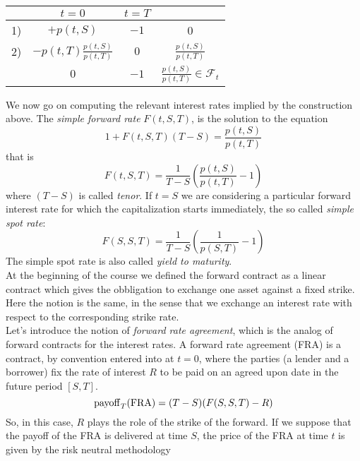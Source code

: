 \begin{center}
    \begin{tabular}{lccc}
        \toprule
           & $t=0$ & $t=T$ \\\midrule
        1) & $+p(t,S)$ & $-1$ & 0 \\
        2) & $-p(t,T)\tfrac{p(t,S)}{p(t,T)}$ & $0$ & $\tfrac{p(t,S)}{p(t,T)}$ \\
        \midrule\midrule
           & $0$ & $-1$ & $\tfrac{p(t,S)}{p(t,T)}\in\mathcal{F}_t$ \\\bottomrule
    \end{tabular}
\end{center}
We now go on computing the relevant interest rates implied by the construction above. The \emph{simple forward rate} $F(t,S,T)$, is the solution to the equation
\begin{equation}
    1 + F(t,S,T)(T-S) = \frac{p(t,S)}{p(t,T)}
\end{equation}
that is
\begin{equation}
    F(t,S,T) = \frac{1}{T-S}\left(\frac{p(t,S)}{p(t,T)}-1\right)
\end{equation}
where $(T-S)$ is called \emph{tenor}. If $t=S$ we are considering a particular forward interest rate for which the capitalization starts immediately, the so called \emph{simple spot rate}:
\begin{equation}
    F(S,S,T) = \frac{1}{T-S}\left(\frac{1}{p(S,T)}-1\right)
\end{equation}
The simple spot rate is also called \emph{yield to maturity}.\\
At the beginning of the course we defined the forward contract as a linear contract which gives the obbligation to exchange one asset against a fixed strike. Here the notion is the same, in the sense that we exchange an interest rate with respect to the corresponding strike rate.\\
Let's introduce the notion of \emph{forward rate agreement}, which is the analog of forward contracts for the interest rates. A forward rate agreement (FRA) is a contract, by convention entered into at $t = 0$, where the parties (a lender and a borrower) fix the rate of interest $R$ to be paid on an agreed upon date in the future period $[S,T]$.
\begin{equation}
    \operatorname{payoff}_T(\text{FRA}) = (T-S)(F(S,S,T)-R)
\end{equation}
So, in this case, $R$ plays the role of the strike of the forward. If we suppose that the payoff of the FRA is delivered at time $S$, the price of the FRA at time $t$ is given by the risk neutral methodology
